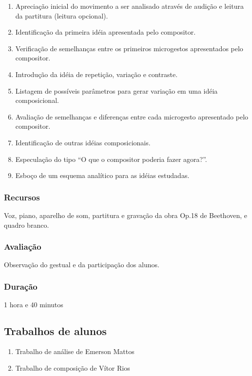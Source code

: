 \documentclass[12pt]{article}
\begin{document}
\begin{enumerate}
\item Apreciação inicial do movimento a ser analisado através de
  audição e leitura da partitura (leitura opcional).
\item Identificação da primeira idéia apresentada pelo compositor.
\item Verificação de semelhanças entre os primeiros microgestos
  apresentados pelo compositor.
\item Introdução da idéia de repetição, variação e contraste.
\item Listagem de possíveis parâmetros para gerar variação em uma
  idéia composicional.
\item Avaliação de semelhanças e diferenças entre cada microgesto
  apresentado pelo compositor.
\item Identificação de outras idéias composicionais.
\item Especulação do tipo ``O que o compositor poderia fazer agora?''.
\item Esboço de um esquema analítico para as idéias estudadas.
\end{enumerate}

\subsubsection{Recursos}
Voz, piano, aparelho de som, partitura e gravação da obra Op.18 de
Beethoven, e quadro branco.

\subsubsection{Avaliação}
Observação do gestual e da participação dos alunos.

\subsubsection{Duração}
1 hora e 40 minutos

\subsection{Trabalhos de alunos}
\label{sec:trabalhos-de-alunos}

\begin{enumerate}
\item Trabalho de análise de Emerson Mattos
\item Trabalho de composição de Vítor Rios
\end{enumerate}
\end{document}
